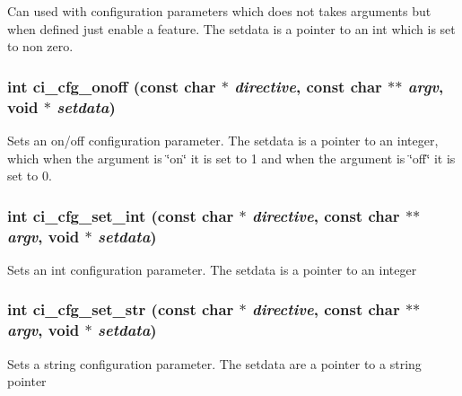 Can used with configuration parameters which does not takes arguments but when defined just enable a feature. The setdata is a pointer to an int which is set to non zero. \hypertarget{group__CONFIG_ga583eafc74c32ad5120e355f0e6bc5084}{
\subsubsection[{ci\_\-cfg\_\-onoff}]{\setlength{\rightskip}{0pt plus 5cm}int ci\_\-cfg\_\-onoff (const char $\ast$ {\em directive}, \/  const char $\ast$$\ast$ {\em argv}, \/  void $\ast$ {\em setdata})}}
\label{group__CONFIG_ga583eafc74c32ad5120e355f0e6bc5084}


Sets an on/off configuration parameter. The setdata is a pointer to an integer, which when the argument is \char`\"{}on\char`\"{} it is set to 1 and when the argument is \char`\"{}off\char`\"{} it is set to 0. \hypertarget{group__CONFIG_gae235e03dc945cafe02704d0fee3d561b}{
\subsubsection[{ci\_\-cfg\_\-set\_\-int}]{\setlength{\rightskip}{0pt plus 5cm}int ci\_\-cfg\_\-set\_\-int (const char $\ast$ {\em directive}, \/  const char $\ast$$\ast$ {\em argv}, \/  void $\ast$ {\em setdata})}}
\label{group__CONFIG_gae235e03dc945cafe02704d0fee3d561b}


Sets an int configuration parameter. The setdata is a pointer to an integer \hypertarget{group__CONFIG_ga6f436fc4f3cee87e4b70a5bef389b45f}{
\subsubsection[{ci\_\-cfg\_\-set\_\-str}]{\setlength{\rightskip}{0pt plus 5cm}int ci\_\-cfg\_\-set\_\-str (const char $\ast$ {\em directive}, \/  const char $\ast$$\ast$ {\em argv}, \/  void $\ast$ {\em setdata})}}
\label{group__CONFIG_ga6f436fc4f3cee87e4b70a5bef389b45f}


Sets a string configuration parameter. The setdata are a pointer to a string pointer 